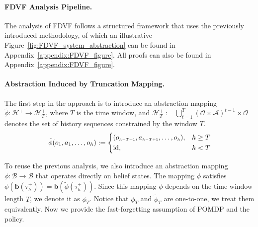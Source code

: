 \documentclass[twoside]{article}
\newcommand{\CAL}[1]{\mathcal{#1}}
\newcommand{\zyh}[1]{{\color{blue}{ [\textbf{Youheng:}} #1]}}
\begin{document}
\paragraph{FDVF Analysis Pipeline.}

The analysis of FDVF follows a structured framework that uses the previously introduced methodology, of which an illustrative Figure~\ref{fig:FDVF_system_abstraction} can be found in Appendix~\ref{appendix:FDVF_figure}. All proofs can also be found in Appendix~\ref{appendix:FDVF_figure}.



\paragraph{Abstraction Induced by Truncation Mapping.}

The first step in the approach is to introduce an abstraction mapping $\tilde{\phi}:\CAL{H}^+\to \CAL{H}_{T}^+$, where $T$ is the time window, and $\CAL{H}_T^+:=\bigcup_{t=1}^T(\CAL{O}\times\CAL{A})^{t-1}\times\CAL{O}$ denotes the set of history sequences constrained by the window $T$. %
\begin{align*}
\tilde{\phi}(o_1,a_1,\dots,o_h) :=
\begin{dcases}
(o_{\scriptscriptstyle h-T+1}, a_{\scriptscriptstyle h-T+1}, \dots, o_{\scriptscriptstyle h}), & h \geq T \\
\mathrm{id}, & h < T
\end{dcases}
\end{align*}

To reuse the previous analysis, we also introduce an abstraction mapping $\phi:\CAL{B}\to\CAL{B}$ that operates directly on belief states. %
The mapping $\phi$ satisfies $\phi(\mathbf{b}(\tau_h^+))=\mathbf{b}(\tilde{\phi}(\tau_h^+))$. Since this mapping $\phi$ depends on the time window length $T$, we denote it as $\phi_T$. Notice that $\phi_T$ and $\tilde{\phi}_T$ are one-to-one, we treat them equivalently. Now we provide the fast-forgetting assumption of POMDP and the policy.
\end{document}

